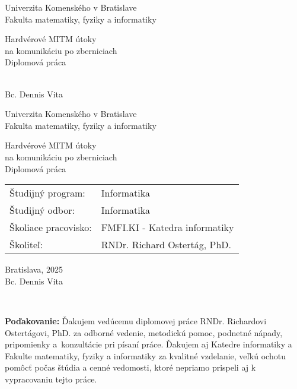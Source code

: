 \documentclass[12pt, twoside]{book}
\def\mfrok{2025}
\def\mfnazov{Hardvérové MITM útoky\\na komunikáciu po zberniciach}
\def\mftyp{Diplomová práca}
\def\mfautor{Bc. Dennis Vita}
\def\mfskolitel{RNDr. Richard Ostertág, PhD. }
\def\mfmiesto{Bratislava, \mfrok}
\def\mfodbor{ Informatika}
\def\program{ Informatika }
\def\mfpracovisko{ FMFI.KI - Katedra informatiky }
\begin{document}
\frontmatter
\pagestyle{empty}

\begin{center}
\sc\large
Univerzita Komenského v Bratislave\\
Fakulta matematiky, fyziky a informatiky

\vfill

{\LARGE\mfnazov}\\
\mftyp
\end{center}

\vfill

{\sc\large 
\noindent \mfrok\\
\mfautor
}

\cleardoublepage


\noindent
\setcounter{page}{1}

\begin{center}
\sc  
\large
Univerzita Komenského v Bratislave\\
Fakulta matematiky, fyziky a informatiky

\vfill

{\LARGE\mfnazov}\\
\mftyp
\end{center}

\vfill

\noindent
\begin{tabular}{ll}
Študijný program: & \program \\
Študijný odbor: & \mfodbor \\
Školiace pracovisko: & \mfpracovisko \\
Školiteľ: & \mfskolitel \\
\end{tabular}

\vfill


\noindent \mfmiesto\\
\mfautor

\cleardoublepage


\newpage 


\cleardoublepage


\newpage
\pagestyle{plain}
~

\vfill
{\bf Poďakovanie:} Ďakujem vedúcemu diplomovej práce RNDr. Richardovi Ostertágovi, PhD. za odborné vedenie, metodickú pomoc, podnetné nápady, pripomienky a~konzultácie pri písaní práce. Ďakujem aj Katedre informatiky a Fakulte matematiky, fyziky a informatiky za kvalitné vzdelanie, veľkú ochotu pomôcť počas štúdia a cenné vedomosti, ktoré nepriamo prispeli aj k vypracovaniu tejto práce.
\end{document}
